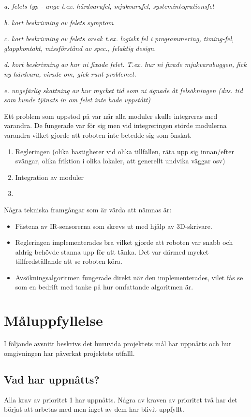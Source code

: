 \documentclass[11pt]{article}
\begin{document}
\textit{a. felets typ - ange t.ex.  hårdvarufel, mjukvarufel, systemintegrationsfel }

\textit{b. kort beskrivning av felets symptom }

\textit{c. kort beskrivning av felets orsak t.ex. logiskt fel i programmering, timing-fel, glappkontakt, missförstånd av spec., felaktig design. }

\textit{d. kort beskrivning av hur ni fixade felet. T.ex. hur ni fixade mjukvarubuggen, fick ny hårdvara, virade om, gick runt problemet. }

\textit{e. ungefärlig skattning av hur mycket tid som ni ägnade åt felsökningen (dvs. tid som kunde tjänats in om felet inte hade uppstått)}

Ett problem som uppstod på var när alla moduler skulle integreras med varandra. De fungerade var för sig men vid integreringen störde modulerna varandra vilket gjorde att roboten inte betedde sig som önskat.

\begin{enumerate}
  \item Regleringen (olika hastigheter vid olika tillfällen, räta upp sig innan/efter svängar, olika friktion i olika lokaler, att generellt undvika väggar osv)
  \item Integration av moduler
  \item 
\end{enumerate}

Några tekniska framgångar som är värda att nämnas är:
\begin{itemize}
\item Fästena av IR-sensorerna som skrevs ut med hjälp av 3D-skrivare.
\item Regleringen implementerades bra vilket gjorde att roboten var snabb och aldrig behövde stanna upp för att tänka. Det var därmed mycket tillfredställande att se roboten köra. 
\item Avsökningsalgoritmen fungerade direkt när den implementerades, vilet fås se som en bedrift med tanke på hur omfattande algoritmen är. 
\end{itemize} 

\section{Måluppfyllelse}
I följande avsnitt beskrivs det huruvida projektets mål har uppnåtts och hur omgivningen har påverkat projektets utfalll.

\subsection{Vad har uppnåtts?}
Alla krav av prioritet 1 har uppnåtts. Några av kraven av prioritet två har det börjat att arbetas med men inget av dem har blivit uppfyllt.
\end{document}
